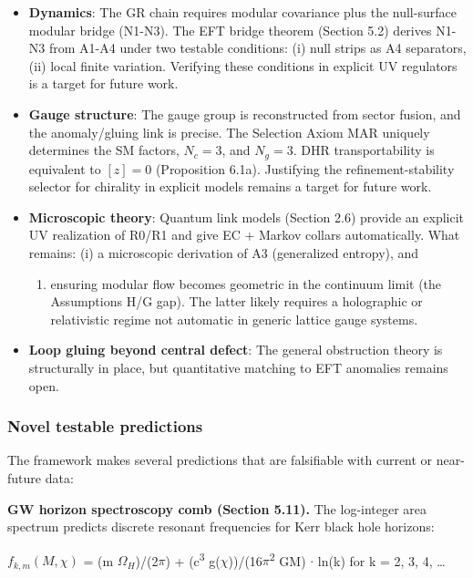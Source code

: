 \documentclass[11pt,a4paper]{article}
\theoremstyle{remark}
\providecommand{\tightlist}{%
  \setlength{\itemsep}{0pt}\setlength{\parskip}{0pt}}
\begin{document}
\begin{itemize}
\tightlist
\item
  \textbf{Dynamics}: The GR chain requires modular covariance plus the null-surface
  modular bridge (N1-N3). The EFT bridge theorem (Section 5.2) derives
  N1-N3 from A1-A4 under two testable conditions: (i) null strips as A4
  separators, (ii) local finite variation. Verifying these conditions in explicit UV regulators is a target for future work.
\item
  \textbf{Gauge structure}: The gauge group is reconstructed from sector fusion,
  and the anomaly/gluing link is precise. The Selection Axiom MAR uniquely
  determines the SM factors, \(N_c = 3\), and \(N_g = 3\). DHR transportability
  is equivalent to \([z]=0\) (Proposition 6.1a). Justifying the
  refinement-stability selector for chirality in explicit models remains
  a target for future work.
\item
  \textbf{Microscopic theory}: Quantum link models (Section 2.6) provide an
  explicit UV realization of R0/R1 and give EC + Markov collars automatically.
  What remains: (i) a microscopic derivation of A3 (generalized entropy), and

  \begin{enumerate}
  \def\labelenumi{(\roman{enumi})}
  \setcounter{enumi}{1}
  \tightlist
  \item
    ensuring modular flow becomes geometric in the continuum limit (the
    Assumptions H/G gap). The latter likely requires a holographic or relativistic
    regime not automatic in generic lattice gauge systems.
  \end{enumerate}
\item
  \textbf{Loop gluing beyond central defect}: The general obstruction theory is
  structurally in place, but quantitative matching to EFT anomalies remains
  open.
\end{itemize}

\subsubsection{Novel testable predictions}\label{novel-testable-predictions}

The framework makes several predictions that are falsifiable with current or
near-future data:

\textbf{GW horizon spectroscopy comb (Section 5.11).} The log-integer area spectrum predicts discrete resonant frequencies for Kerr black hole horizons:

\(f_{k,m}(M,\ensuremath{\chi})\) = (m \(\ensuremath{\Omega}_H\))/(2\ensuremath{\pi}) + (c\textsuperscript{3} g(\ensuremath{\chi}))/(16\ensuremath{\pi}\textsuperscript{2} GM) \ensuremath{\cdot} ln(k) for k = 2, 3, 4, \ldots{}
\end{document}
